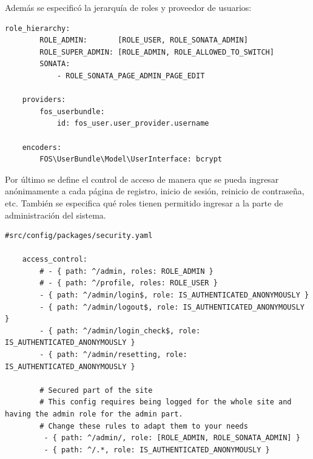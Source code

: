 \documentclass{article}
\begin{document}
\noindent
Además se especificó la jerarquía de roles y proveedor de usuarios:

\begin{lstlisting}[caption={Jerarquía de roles, tipo de encriptación y proveedor de usuarios}]
    role_hierarchy:
        ROLE_ADMIN:       [ROLE_USER, ROLE_SONATA_ADMIN]
        ROLE_SUPER_ADMIN: [ROLE_ADMIN, ROLE_ALLOWED_TO_SWITCH]
        SONATA:
            - ROLE_SONATA_PAGE_ADMIN_PAGE_EDIT

    providers:
        fos_userbundle:
            id: fos_user.user_provider.username

    encoders:
        FOS\UserBundle\Model\UserInterface: bcrypt
\end{lstlisting}

\newpage
Por último se define el control de acceso de manera que se pueda ingresar anónimamente a cada página de registro, inicio de sesión, reinicio de contraseña,
etc.
También se especifica qué roles tienen permitido ingresar a la parte de administración del sistema.

\begin{lstlisting}[caption=Control de acceso]
#src/config/packages/security.yaml

    access_control:
        # - { path: ^/admin, roles: ROLE_ADMIN }
        # - { path: ^/profile, roles: ROLE_USER }
        - { path: ^/admin/login$, role: IS_AUTHENTICATED_ANONYMOUSLY }
        - { path: ^/admin/logout$, role: IS_AUTHENTICATED_ANONYMOUSLY }
        - { path: ^/admin/login_check$, role: IS_AUTHENTICATED_ANONYMOUSLY }
        - { path: ^/admin/resetting, role: IS_AUTHENTICATED_ANONYMOUSLY }

        # Secured part of the site
        # This config requires being logged for the whole site and having the admin role for the admin part.
        # Change these rules to adapt them to your needs
         - { path: ^/admin/, role: [ROLE_ADMIN, ROLE_SONATA_ADMIN] }
         - { path: ^/.*, role: IS_AUTHENTICATED_ANONYMOUSLY }

\end{lstlisting}


\newpage
\printbibliography
\end{document}
